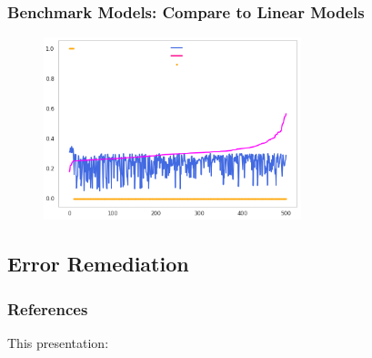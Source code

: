 \documentclass[11pt,
               aspectratio=43,
               hyperref={colorlinks}
               ]{beamer}
\begin{document}
			\begin{frame}
		
				\frametitle{\textbf{Benchmark Models}: Compare to Linear Models}
				\begin{figure}[htb]
					\begin{center}
						\includegraphics[height=150pt]{img/benchmark.png}
					\end{center}
				\end{figure}	
				
			\end{frame}

		\subsection{Error Remediation}



	\begin{frame}[t, allowframebreaks]
	
		\frametitle{References}	
		
			This presentation:\\
					
		\framebreak		
		
		\printbibliography
		
	\end{frame}
\end{document}
